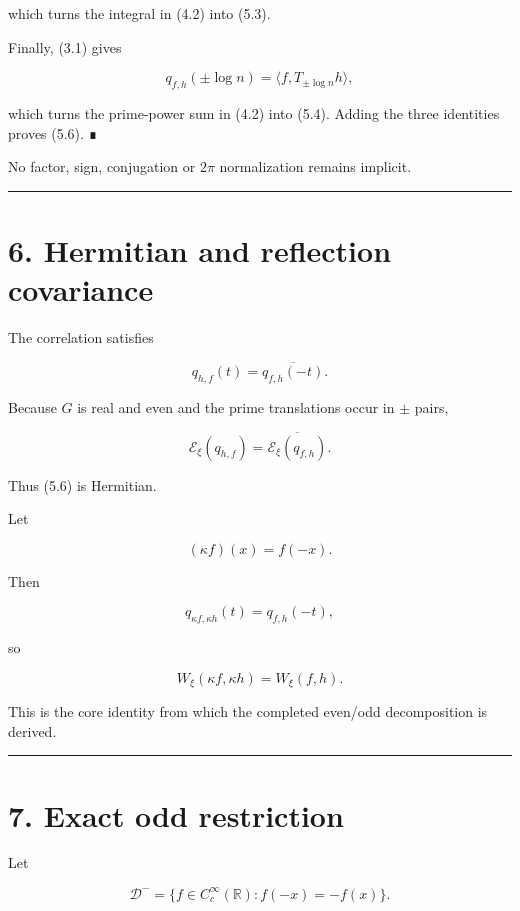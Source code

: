 which turns the integral in (4.2) into (5.3).

Finally, (3.1) gives

\[
q_{f,h}(\pm\log n)
=\langle f,T_{\pm\log n}h\rangle,
\]

which turns the prime-power sum in (4.2) into (5.4). Adding the three identities
proves (5.6). ∎

No factor, sign, conjugation or \(2\pi\) normalization remains implicit.

\begin{center}\rule{0.5\linewidth}{0.5pt}\end{center}

\hypertarget{hermitian-and-reflection-covariance}{%
\section{6. Hermitian and reflection covariance}\label{hermitian-and-reflection-covariance}}

The correlation satisfies

\[
q_{h,f}(t)=\overline{q_{f,h}(-t)}.
\tag{6.1}
\]

Because \(G\) is real and even and the prime translations occur in \(\pm\) pairs,

\[
\mathcal E_\xi(q_{h,f})
=
\overline{\mathcal E_\xi(q_{f,h})}.
\tag{6.2}
\]

Thus (5.6) is Hermitian.

Let

\[
(\kappa f)(x)=f(-x).
\]

Then

\[
q_{\kappa f,\kappa h}(t)=q_{f,h}(-t),
\]

so

\[
\boxed{
W_\xi(\kappa f,\kappa h)=W_\xi(f,h).
}
\tag{6.3}
\]

This is the core identity from which the completed even/odd decomposition is
derived.

\begin{center}\rule{0.5\linewidth}{0.5pt}\end{center}

\hypertarget{exact-odd-restriction}{%
\section{7. Exact odd restriction}\label{exact-odd-restriction}}

Let

\[
\mathcal D^-
=
\{f\in C_c^\infty(\mathbb R):f(-x)=-f(x)\}.
\]

